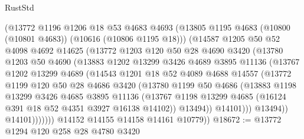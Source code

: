 \begin{lexlean}{RustStd}
\begin{coremodule}
                (@13772
                  @1196
                  @1206
                  @18
                  @53
                  @4683
                  @4693
                  (@13805 @1195 @4683 (@10800 (@10801 @4683)) (@10616 (@10806 @1195 @18)))
                  (@14587
                    @1205
                    @50
                    @52
                    @4098
                    @4692
                    @14625
                    (@13772
                      @1203
                      @120
                      @50
                      @28
                      @4690
                      @3420
                      (@13780
                        @1203
                        @50
                        @4690
                        (@13883
                          @1202
                          @13299
                          @3426
                          @4689
                          @3895
                          @11136
                          (@13767
                            @1202
                            @13299
                            @4689
                            (@14543
                              @1201
                              @18
                              @52
                              @4089
                              @4688
                              @14557
                              (@13772
                                @1199
                                @120
                                @50
                                @28
                                @4686
                                @3420
                                (@13780
                                  @1199
                                  @50
                                  @4686
                                  (@13883
                                    @1198
                                    @13299
                                    @3426
                                    @4685
                                    @3895
                                    @11136
                                    (@13767
                                      @1198
                                      @13299
                                      @4685
                                      (@16124 @391 @18 @52 @4351 @3927 @16138 @14102))
                                    @13494))
                                @14101)))
                          @13494))
                      @14101)))))))
        @14152
        @14155
        @14158
        @14161
        @10779))
@18672 := @13772 @1294 @120 @258 @28 @4780 @3420

\end{coremodule}
\end{lexlean}
